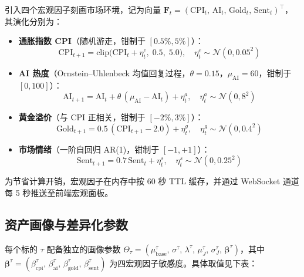 \documentclass[12pt,a4paper]{article}
\begin{document}
引入四个宏观因子刻画市场环境，记为向量 $\mathbf{F}_t = (\mathrm{CPI}_t,\, \mathrm{AI}_t,\, \mathrm{Gold}_t,\, \mathrm{Sent}_t)^{\top}$，其演化分别为：

\begin{itemize}
\item \textbf{通胀指数 CPI}（随机游走，钳制于 $[0.5\%, 5\%]$）：
\begin{equation}
\mathrm{CPI}_{t+1} = \mathrm{clip}\bigl(\mathrm{CPI}_t + \eta^{c}_t,\; 0.5,\; 5.0\bigr),\quad \eta^{c}_t \sim \mathcal{N}(0, 0.05^2)
\end{equation}

\item \textbf{AI 热度}（Ornstein--Uhlenbeck 均值回复过程，$\theta=0.15$，$\mu_{\mathrm{AI}}=60$，钳制于 $[0,100]$）：
\begin{equation}
\mathrm{AI}_{t+1} = \mathrm{AI}_t + \theta\,(\mu_{\mathrm{AI}} - \mathrm{AI}_t) + \eta^{a}_t,\quad \eta^{a}_t \sim \mathcal{N}(0, 8^2)
\end{equation}

\item \textbf{黄金溢价}（与 CPI 正相关，钳制于 $[-2\%, 3\%]$）：
\begin{equation}
\mathrm{Gold}_{t+1} = 0.5\,(\mathrm{CPI}_{t+1} - 2.0) + \eta^{g}_t,\quad \eta^{g}_t \sim \mathcal{N}(0, 0.4^2)
\end{equation}

\item \textbf{市场情绪}（一阶自回归 AR(1)，钳制于 $[-1, +1]$）：
\begin{equation}
\mathrm{Sent}_{t+1} = 0.7\,\mathrm{Sent}_t + \eta^{s}_t,\quad \eta^{s}_t \sim \mathcal{N}(0, 0.25^2)
\end{equation}
\end{itemize}

为节省计算开销，宏观因子在内存中按 60 秒 TTL 缓存，并通过 WebSocket 通道每 5 秒推送至前端宏观面板。

\subsection{资产画像与差异化参数}
\label{sec:profile}

每个标的 $\tau$ 配备独立的画像参数 $\Theta_\tau = (\mu^{\tau}_{\mathrm{base}},\, \sigma^{\tau},\, \lambda^{\tau},\, \mu^{\tau}_J,\, \sigma^{\tau}_J,\, \boldsymbol{\beta}^{\tau})$，其中 $\boldsymbol{\beta}^{\tau} = (\beta^{\tau}_{\mathrm{cpi}},\, \beta^{\tau}_{\mathrm{ai}},\, \beta^{\tau}_{\mathrm{gold}},\, \beta^{\tau}_{\mathrm{sent}})$ 为四宏观因子敏感度。具体取值见下表：
\end{document}
